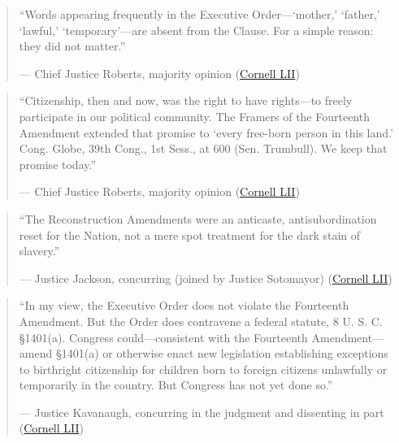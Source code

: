 \documentclass[12pt]{article}
\begin{document}
\begin{quote}
``Words appearing frequently in the Executive Order---`mother,' `father,' `lawful,' `temporary'---are absent from the Clause. For a simple reason: they did not matter.''
\begin{flushright}--- Chief Justice Roberts, majority opinion (\href{https://www.law.cornell.edu/supremecourt/text/25-365}{Cornell LII})\end{flushright}
\end{quote}

\begin{quote}
``Citizenship, then and now, was the right to have rights---to freely participate in our political community. The Framers of the Fourteenth Amendment extended that promise to `every free-born person in this land.' Cong. Globe, 39th Cong., 1st Sess., at 600 (Sen. Trumbull). We keep that promise today.''
\begin{flushright}--- Chief Justice Roberts, majority opinion (\href{https://www.law.cornell.edu/supremecourt/text/25-365}{Cornell LII})\end{flushright}
\end{quote}

\begin{quote}
``The Reconstruction Amendments were an anticaste, antisubordination reset for the Nation, not a mere spot treatment for the dark stain of slavery.''
\begin{flushright}--- Justice Jackson, concurring (joined by Justice Sotomayor) (\href{https://www.law.cornell.edu/supremecourt/text/25-365}{Cornell LII})\end{flushright}
\end{quote}

\begin{quote}
``In my view, the Executive Order does not violate the Fourteenth Amendment. But the Order does contravene a federal statute, 8 U. S. C. \S 1401(a). Congress could---consistent with the Fourteenth Amendment---amend \S 1401(a) or otherwise enact new legislation establishing exceptions to birthright citizenship for children born to foreign citizens unlawfully or temporarily in the country. But Congress has not yet done so.''
\begin{flushright}--- Justice Kavanaugh, concurring in the judgment and dissenting in part (\href{https://www.law.cornell.edu/supremecourt/text/25-365}{Cornell LII})\end{flushright}
\end{quote}
\end{document}

